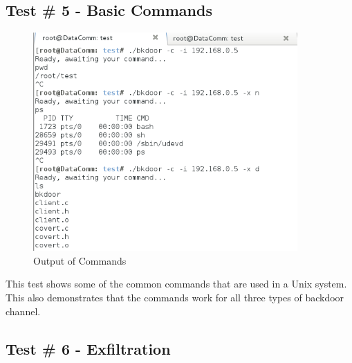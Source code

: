 \documentclass[titlepage]{article}
\begin{document}
\clearpage

\subsection{Test \# 5 - Basic Commands}

\begin{figure}[htb]                                                                       
  \begin{center}
    \includegraphics[width=0.9\textwidth]{Pictures/Commands.png}
  \end{center}
  \caption{Output of Commands}
  \label{fig:commands}
\end{figure}

This test shows some of the common commands that are used in a Unix system.  This also demonstrates that
the commands work for all three types of backdoor channel.

\clearpage

\subsection{Test \# 6 - Exfiltration}
\end{document}
